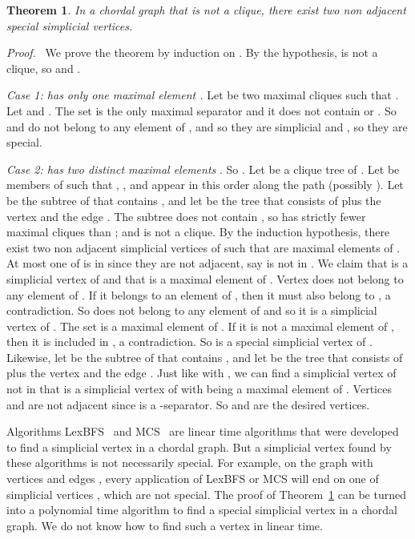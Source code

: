 \documentclass[11pt]{article}
\newtheorem{theorem}{Theorem}
\newenvironment{proof}{\noindent \emph{Proof.}\ }{\hfill
    \vspace{1em}}
\begin{document}
\begin{theorem}
\label{special}
In a chordal graph that is not a clique, there exist two non adjacent
special simplicial vertices.
\end{theorem}
\begin{proof}
We prove the theorem by induction on .  By the
hypothesis,  is not a clique, so  and .

\emph{Case 1:  has only one maximal element .} Let
 be two maximal cliques such that .  Let  and .  The set  is the only
maximal separator and it does not contain  or .  So  and
 do not belong to any element of , and so they are
simplicial and , so they are special.

\emph{Case 2:  has two distinct maximal elements }.
So .  Let  be a clique tree of .  Let  be members of  such that ,
, and  appear in this order along
the path  (possibly ).  Let  be
the subtree of  that contains , and let  be
the tree that consists of  plus the vertex  and the edge
.  The subtree  does not contain , so  has strictly fewer maximal cliques than ; and  is not a
clique.  By the induction hypothesis, there exist two non adjacent
simplicial vertices  of  such that  are maximal elements of .  At most one of 
is in  since they are not adjacent, say  is not in .  We
claim that  is a simplicial vertex of  and that  is a
maximal element of .  Vertex  does not belong to any
element of .  If it belongs to an element of , then it must also belong to , a contradiction.  So  does not belong to any
element of  and so it is a simplicial vertex of .  The
set  is a maximal element of .  If it is not a
maximal element of , then it is included in , a contradiction.  So  is a special simplicial vertex of .
Likewise, let  be the subtree of  that contains
, and let  be the tree that consists of  plus the vertex
 and the edge .  Just like with , we can find a
simplicial vertex  of  not in  that is a
simplicial vertex of  with  being a maximal element of
.  Vertices  and  are not adjacent since  is a
-separator.  So  and  are the desired vertices.
\end{proof}

Algorithms LexBFS~\cite{RTL76} and MCS~\cite{TY84} are linear time
algorithms that were developed to find a simplicial vertex in a
chordal graph.  But a simplicial vertex found by these algorithms is
not necessarily special.  For example, on the graph with vertices
 and edges , every application
of LexBFS or MCS will end on one of simplicial vertices , which
are not special.  The proof of Theorem~\ref{special} can be turned
into a polynomial time algorithm to find a special simplicial vertex
in a chordal graph.  We do not know how to find such a vertex in
linear time.
\end{document}
